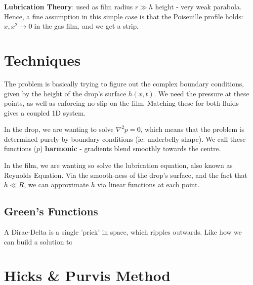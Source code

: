 \documentclass[11pt,a4paper]{article}
\begin{document}
	\textbf{Lubrication Theory}: used as film radius $r \gg h$ height - very weak parabola. Hence, a fine assumption in this simple case is that the Poiseuille profile holds: $x,x^2 \to 0$ in the gas film, and we get a strip.
	

	
	
	
	\section{Techniques}
	The problem is basically trying to figure out the complex boundary conditions, given by the height of the drop's surface $h(x,t)$. We need the pressure at these points, as well as enforcing no-slip on the film. Matching these for both fluids gives a coupled 1D system.
	
	In the drop, we are wanting to solve $\nabla ^2p = 0$, which means that the problem is determined purely by boundary conditions (ie: underbelly shape). We call these functions ($p$) \textbf{harmonic} - gradients blend smoothly towards the centre.
	
	In the film, we are wanting so solve the lubrication equation, also known as Reynolds Equation. Via the smooth-ness of the drop's surface, and the fact that $h \ll R$, we can approximate $h$ via linear functions at each point.
	
	
	
	\subsection{Green's Functions}
	A Dirac-Delta is a single 'prick' in space, which ripples outwards.
	Like how we can build a solution to 
	
	
	
	
	
	\section{Hicks \& Purvis Method}
	
\end{document}
